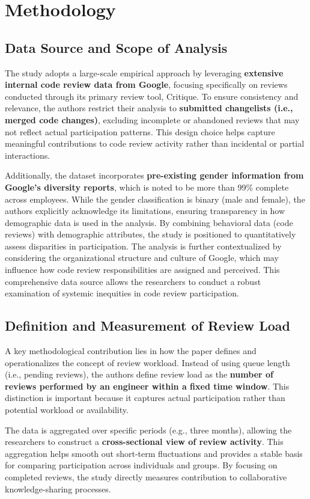 \section{Methodology}
\subsection{Data Source and Scope of Analysis}
The study adopts a large-scale empirical approach by leveraging \textbf{extensive internal code review data from Google}, focusing specifically on reviews conducted through its primary review tool, Critique. To ensure consistency and relevance, the authors restrict their analysis to \textbf{submitted changelists (i.e., merged code changes)}, excluding incomplete or abandoned reviews that may not reflect actual participation patterns. This design choice helps capture meaningful contributions to code review activity rather than incidental or partial interactions.

Additionally, the dataset incorporates \textbf{pre-existing gender information from Google’s diversity reports}, which is noted to be more than 99\% complete across employees. While the gender classification is binary (male and female), the authors explicitly acknowledge its limitations, ensuring transparency in how demographic data is used in the analysis. By combining behavioral data (code reviews) with demographic attributes, the study is positioned to quantitatively assess disparities in participation. The analysis is further contextualized by considering the organizational structure and culture of Google, which may influence how code review responsibilities are assigned and perceived. This comprehensive data source allows the researchers to conduct a robust examination of systemic inequities in code review participation.

\subsection{Definition and Measurement of Review Load}
A key methodological contribution lies in how the paper defines and operationalizes the concept of review workload. Instead of using queue length (i.e., pending reviews), the authors define review load as the \textbf{number of reviews performed by an engineer within a fixed time window}. This distinction is important because it captures actual participation rather than potential workload or availability.

The data is aggregated over specific periods (e.g., three months), allowing the researchers to construct a \textbf{cross-sectional view of review activity}. This aggregation helps smooth out short-term fluctuations and provides a stable basis for comparing participation across individuals and groups. By focusing on completed reviews, the study directly measures contribution to collaborative knowledge-sharing processes.

